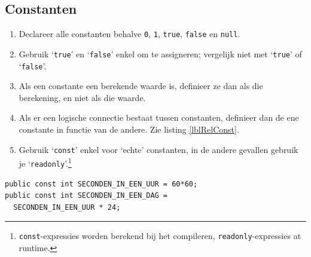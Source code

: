 \documentclass[a4paper,11pt]{article}
\begin{document}
\subsection{Constanten}
\begin{enumerate}[resume]
\item Declareer alle constanten behalve  \lstinline !0!, \lstinline !1!,
\lstinline !true!, \lstinline !false! en \lstinline !null!. 
\item Gebruik `\lstinline !true!' en `\lstinline !false!' enkel om te
assigneren; vergelijk niet met `\lstinline !true!' of `\lstinline !false!'.
\item Als een constante een berekende waarde is, definieer ze dan als die
berekening, en niet als die waarde.
\item Als er een logische connectie bestaat tussen constanten, definieer
dan de ene constante in functie van de andere.  Zie listing \ref{lblRelConst}.
\item Gebruik `\lstinline !const!' enkel voor `echte' constanten, in de
andere gevallen gebruik je 
`\lstinline !readonly!'.\footnote{\lstinline !const!-expressies worden
berekend bij het compileren, \lstinline !readonly!-expressies at runtime.} 
\end{enumerate}
\begin{lstlisting}[float, caption=Gerelateerde constanten, label=lblRelConst]
public const int SECONDEN_IN_EEN_UUR = 60*60;
public const int SECONDEN_IN_EEN_DAG =
  SECONDEN_IN_EEN_UUR * 24;
\end{lstlisting}
\end{document}

